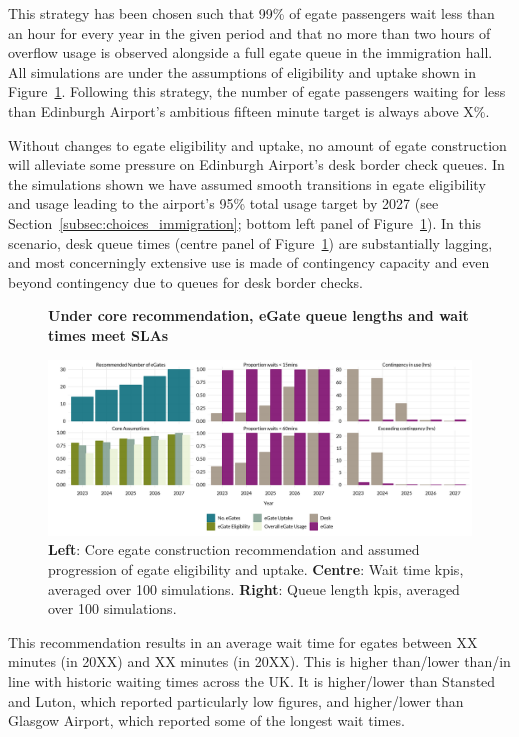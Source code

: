 \documentclass[10pt]{article}
\newcommand*{\figuretitle}[1]{%
    {\centering%
    \textbf{#1}%
    \par\medskip}%
}
\begin{document}
This strategy has been chosen such that 99\% of \gls{egate} passengers wait less than an hour for every year in the given period and that no more than two hours of overflow usage is observed alongside a full \gls{egate} queue in the immigration hall. All simulations are under the assumptions of eligibility and uptake shown in Figure~\ref{fig:core_rec_fig}. Following this strategy, the number of \gls{egate} passengers waiting for less than Edinburgh Airport's ambitious fifteen minute target is always above X\%. 

Without changes to \gls{egate} eligibility and uptake, no amount of \gls{egate} construction will alleviate some pressure on Edinburgh Airport's desk border check queues. In the simulations shown we have assumed smooth transitions in \gls{egate} eligibility and usage leading to the airport's 95\% total usage target by 2027 (see Section~\ref{subsec:choices_immigration}; bottom left panel of Figure~\ref{fig:core_rec_fig}). In this scenario, desk queue times (centre panel of Figure~\ref{fig:core_rec_fig}) are substantially lagging, and most concerningly extensive use is made of contingency capacity and even beyond contingency due to queues for desk border checks. 


\begin{figure}[!ht]
    \centering
    \figuretitle{Under core recommendation, eGate queue lengths and wait times meet SLAs}
    \includegraphics[width=\textwidth]{figures/core_rec_fig.png}
     \caption{\textbf{Left}: Core \gls{egate} construction recommendation and assumed progression of \gls{egate} eligibility and uptake. \textbf{Centre}: Wait time \glspl{kpi}, averaged over 100 simulations. \textbf{Right}: Queue length \glspl{kpi}, averaged over 100 simulations.} \label{fig:core_rec_fig}
\end{figure}

This recommendation results in an average wait time for \glspl{egate} between XX minutes (in 20XX) and XX minutes (in 20XX). This is higher than/lower than/in line with historic waiting times across the UK. It is higher/lower than Stansted and Luton, which reported particularly low figures, and higher/lower than Glasgow Airport, which reported some of the longest wait times. 
\end{document}
